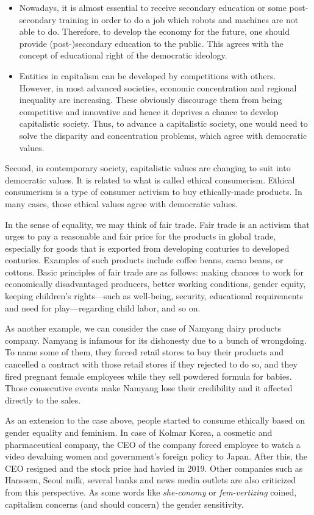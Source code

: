 \documentclass{homework}
\begin{document}
\begin{itemize}
  \item Nowadays, it is almost essential to receive secondary education or some post-secondary training in order to do a job which robots and machines are not able to do. Therefore, to develop the economy for the future, one should provide (post-)secondary education to the public. This agrees with the concept of educational right of the democratic ideology.
  \item Entities in capitalism can be developed by competitions with others. However, in most advanced societies, economic concentration and regional inequality are increasing. These obviously discourage them from being competitive and innovative and hence it deprives a chance to develop capitalistic society. Thus, to advance a capitalistic society, one would need to solve the disparity and concentration problems, which agree with democratic values.
\end{itemize}

Second, in contemporary society, capitalistic values are changing to suit into democratic values. It is related to what is called ethical consumerism. Ethical consumerism is a type of consumer activism to buy ethically-made products. In many cases, those ethical values agree with democratic values.

In the sense of equality, we may think of fair trade. Fair trade is an activism that urges to pay a reasonable and fair price for the products in global trade, especially for goods that is exported from developing conturies to developed conturies. Examples of such products include coffee beans, cacao beans, or cottons. Basic principles of fair trade are as follows: making chances to work for economically disadvantaged producers, better working conditions, gender equity, keeping children's rights---such as well-being, security, educational requirements and need for play---regarding child labor, and so on.

As another example, we can consider the case of Namyang dairy products company. Namyang is infamous for its dishonesty due to a bunch of wrongdoing. To name some of them, they forced retail stores to buy their products and cancelled a contract with those retail stores if they rejected to do so, and they fired pregnant female employees while they sell powdered formula for babies. Those consecutive events make Namyang lose their credibility and it affected directly to the sales. \cite{Namyang}

As an extension to the case above, people started to consume ethically based on gender equality and feminism. In case of Kolmar Korea, a cosmetic and pharmaceutical company, the CEO of the company forced employee to watch a video devaluing women and government's foreign policy to Japan. After this, the CEO resigned and the stock price had havled in 2019. \cite{Kolmar} Other companies such as Hanssem, Seoul milk, several banks and news media outlets are also criticized from this perspective. As some words like \textit{she-conomy} or \textit{fem-vertizing} coined, capitalism concerns (and should concern) the gender sensitivity.
\end{document}
